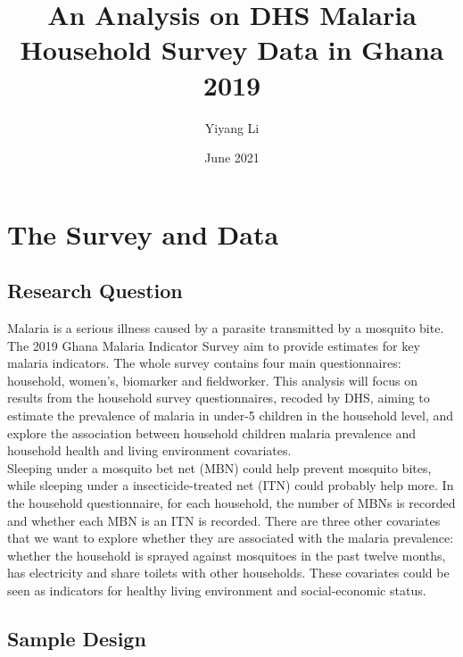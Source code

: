 \documentclass[11pt]{article}
\title{An Analysis on DHS Malaria Household Survey Data in Ghana 2019}
\author{Yiyang Li}
\date{June 2021}
\begin{document}
\maketitle

\section{The Survey and Data}

\subsection{Research Question}

Malaria is a serious illness caused by a parasite transmitted by a mosquito bite. The 2019 Ghana Malaria Indicator Survey aim to provide estimates for key malaria indicators. The whole survey contains four main questionnaires: household, women's, biomarker and fieldworker. This analysis will focus on results from the household survey questionnaires, recoded by DHS, aiming to estimate the prevalence of malaria in under-5 children in the household level, and explore the association between household children malaria prevalence and household health and living environment covariates.   \\
Sleeping under a mosquito bet net (MBN) could help prevent mosquito bites, while sleeping under a insecticide-treated net (ITN) could probably help more. In the household questionnaire, for each household, the number of MBNs is recorded and whether each MBN is an ITN is recorded. There are three other covariates that we want to explore whether they are associated with the malaria prevalence: whether the household is sprayed against mosquitoes in the past twelve months, has electricity and share toilets with other households. These covariates could be seen as indicators for healthy living environment and social-economic status. 

\subsection{Sample Design}
\end{document}
